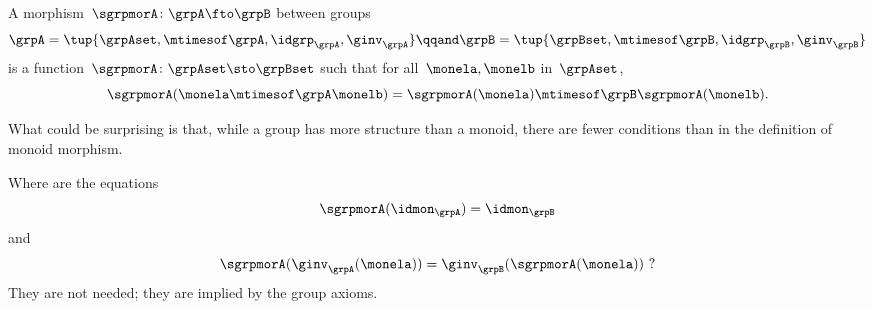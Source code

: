 
\begin{ctdefinition}
    \label{def:group-mor}
    A morphism~$\sgrpmorA\colon \grpA \fto \grpB$ between groups
    \begin{equation*}
        \grpA = \tup{\grpAset, \mtimesof\grpA, \idgrp_\grpA, \ginv_\grpA}
        \qqand
        \grpB = \tup{\grpBset, \mtimesof\grpB, \idgrp_\grpB,  \ginv_\grpB}
    \end{equation*}
    is a function~$\sgrpmorA \colon \grpAset \sto \grpBset$ such that for all~$\monela, \monelb$ in~$\grpAset$,
    \begin{equation}
        \label{eq:group-mor-comp}
        \sgrpmorA (\monela \mtimesof\grpA \monelb) = \sgrpmorA (\monela) \mtimesof\grpB  \sgrpmorA(\monelb).
    \end{equation}
\end{ctdefinition}

What could be surprising is that, while a group has more structure than a monoid, there are fewer conditions than in the definition of monoid morphism.

Where are the equations
\begin{equation}
    \label{eq:grp-id-comp}
    \sgrpmorA (\idmon_\grpA) = \idmon_{\grpB}
\end{equation}
and
\begin{equation}
    \label{eq:grp-inv-comp}
    \sgrpmorA (\ginv_\grpA(\monela)) = \ginv_\grpB(\sgrpmorA(\monela)) \ ?
\end{equation}
%
They are not needed; they are implied by the group axioms.

